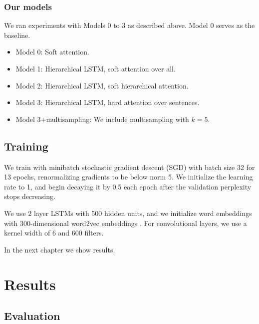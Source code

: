 \documentclass[11pt]{report}
\begin{document}
\subsection{Our models}

We ran experiments with Models 0 to 3 as described above. Model 0 serves as the baseline.

\begin{itemize}
\item Model 0: Soft attention.
\item Model 1: Hierarchical LSTM, soft attention over all.
\item Model 2: Hierarchical LSTM, soft hierarchical attention.
\item Model 3: Hierarchical LSTM, hard attention over sentences.
\item Model 3+multisampling: We include multisampling with $k=5$.
\end{itemize}



\section{Training}

We train with minibatch stochastic gradient descent (SGD) with batch size 32 for 13 epochs, renormalizing gradients to be below norm 5. We initialize the learning rate to 1, and begin decaying it by 0.5 each epoch after the validation perplexity stops decreasing. 

We use 2 layer LSTMs with 500 hidden units, and we initialize word embeddings with 300-dimensional word2vec embeddings \citep{mikolov2013word2vec}. For convolutional layers, we use a kernel width of 6 and 600 filters.


In the next chapter we show results.

\chapter{Results}

\section{Evaluation} %
\end{document}
